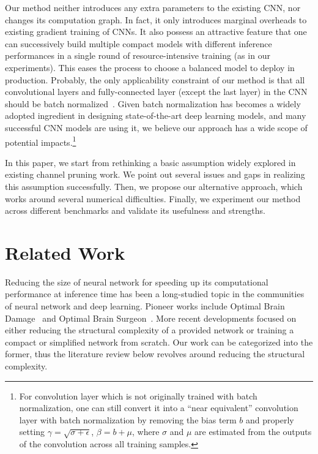 \documentclass{article} %
\begin{document}
Our method neither introduces any extra parameters
to the existing CNN, nor changes its computation graph. In fact, it only introduces 
marginal overheads to existing gradient training of CNNs. It also possess an attractive feature that one 
can successively build multiple compact models with different inference performances in a single round
of resource-intensive training (as in our experiments). 
This eases the process to choose a balanced model to deploy in production. 
Probably, the only applicability constraint of our method is that all 
convolutional layers and fully-connected layer (except the last layer) in the CNN should be batch normalized~\citep{ioffe2015batch}. 
Given batch normalization has becomes a widely adopted ingredient in designing state-of-the-art deep learning models,
and many successful CNN models are using it, we believe our approach has a wide scope of potential impacts.\footnote{For convolution layer which is not originally trained with batch normalization, one can still convert it into a ``near equivalent'' convolution layer with batch normalization by removing the bias term $b$ and properly setting $\gamma = \sqrt{\sigma + \epsilon}$, $\beta = b + \mu$, where $\sigma$ and $\mu$ are estimated from the outputs of the convolution across all training samples.}

In this paper, we start from rethinking a basic assumption widely explored in existing channel pruning
work. We point out several issues and gaps in realizing this assumption successfully. Then, we propose
our alternative approach, which works around several numerical difficulties. 
Finally, we experiment our method across different benchmarks and validate its usefulness and strengths.

\section{Related Work}

Reducing the size of neural network for speeding up its computational performance at inference time has been a long-studied topic in the communities of 
neural network and deep learning. Pioneer works include Optimal Brain Damage~\citep{lecun1990optimal} and Optimal Brain Surgeon~\citep{hassibi1993second}.
More recent developments focused on either reducing the structural complexity of 
a provided network or training a compact or simplified network from scratch. 
Our work can be categorized into the former, thus the literature review below revolves
around reducing the structural complexity.
\end{document}
